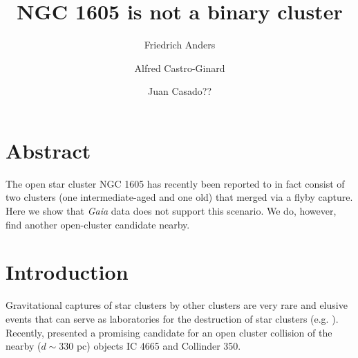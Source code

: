 \documentclass[RNAAS]{aastex631}
\begin{document}
\title{NGC 1605 is not a binary cluster}


\author[0000-0003-4524-9363]{Friedrich Anders}

\author[0000-0002-9419-3725]{Alfred Castro-Ginard}

\author[0000-0003-4105-2520]{Juan Casado??}



\section{Abstract}
The open star cluster NGC 1605 has recently been reported to in fact consist of two clusters (one intermediate-aged and one old) that merged via a flyby capture. Here we show that {\it Gaia} data does not support this scenario. We do, however, find another open-cluster candidate nearby.

\section{Introduction}
Gravitational captures of star clusters by other clusters are very rare and elusive events that can serve as laboratories for the destruction of star clusters (e.g. \citealt{Soubiran2018, Casado2022}). Recently, \citet{Piatti2022} presented a promising candidate for an open cluster collision of the nearby ($d\sim330$ pc) objects IC 4665 and Collinder 350.
\end{document}
